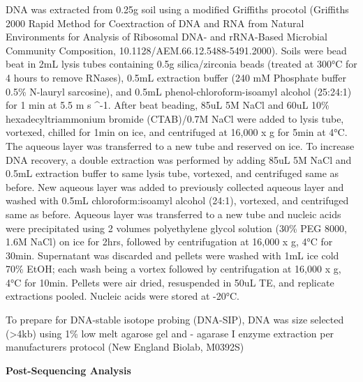 DNA was extracted from 0.25g soil using a modified Griffiths procotol (Griffiths 2000 Rapid Method for Coextraction of DNA and RNA from Natural Environments for Analysis of Ribosomal DNA- and rRNA-Based Microbial Community Composition, 10.1128/AEM.66.12.5488-5491.2000).  Soils were bead beat in 2mL lysis tubes containing 0.5g silica/zirconia beads (treated at 300°C for 4 hours to remove RNases), 0.5mL extraction buffer (240 mM Phosphate buffer
0.5\% N-lauryl sarcosine), and 0.5mL phenol-chloroform-isoamyl alcohol (25:24:1) for 1 min at 5.5 m s ^{-1}.  After beat beading, 85uL 5M NaCl and 60uL 10\% hexadecyltriammonium bromide (CTAB)/0.7M NaCl were added to lysis tube, vortexed, chilled for 1min on ice, and centrifuged at 16,000 x g for 5min at 4°C.  The aqueous layer was transferred to a new tube and reserved on ice.  To increase DNA recovery, a double extraction was performed by adding 85uL 5M NaCl and 0.5mL extraction buffer to same lysis tube, vortexed, and centrifuged same as before.  New aqueous layer was added to previously collected aqueous layer and washed with 0.5mL chloroform:isoamyl alcohol (24:1), vortexed, and centrifuged same as before.  Aqueous layer was transferred to a new tube and nucleic acids were precipitated using 2 volumes polyethylene glycol solution (30\% PEG 8000, 1.6M NaCl) on ice for 2hrs, followed by centrifugation at 16,000 x g, 4°C for 30min.  Supernatant was discarded and pellets were washed with 1mL ice cold 70\% EtOH; each wash being a vortex followed by centrifugation at 16,000 x g, 4°C for 10min.  Pellets were air dried, resuspended in 50uL TE, and replicate extractions pooled.  Nucleic acids were stored at -20°C.                   

To prepare for DNA-stable isotope probing (DNA-SIP), DNA was size selected (>4kb) using 1\% low melt agarose gel and {\beta}- agarase I enzyme extraction per manufacturers protocol (New England Biolab, M0392S)

\textbf{Post-Sequencing Analysis}
 